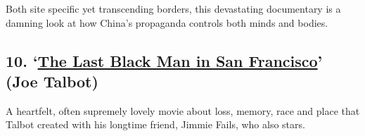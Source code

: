 Both site specific yet transcending borders, this devastating
documentary is a damning look at how China's propaganda controls both
minds and bodies.

\hypertarget{10-the-last-black-man-in-san-francisco-joe-talbot}{%
\subsection{\texorpdfstring{10.
`\href{https://www.nytimes.com/2019/06/06/movies/the-last-black-man-in-san-francisco-review.html}{The
Last Black Man in San Francisco}' (Joe
Talbot)}{10. `The Last Black Man in San Francisco' (Joe Talbot)}}\label{10-the-last-black-man-in-san-francisco-joe-talbot}}

A heartfelt, often supremely lovely movie about loss, memory, race and
place that Talbot created with his longtime friend, Jimmie Fails, who
also stars.

